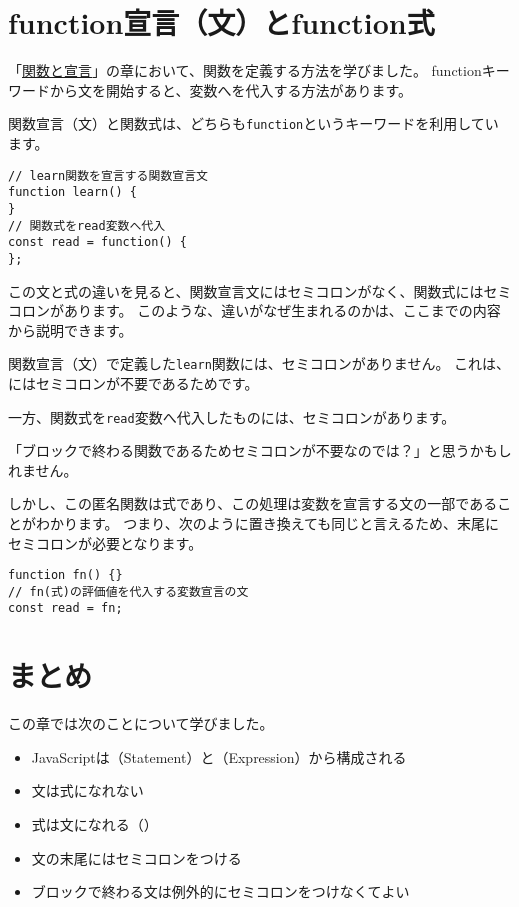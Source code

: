 \hypertarget{function-statement-and-function-expression}{%
\section{function宣言（文）とfunction式}\label{function-statement-and-function-expression}}

「\hyperlink{function-and-declaration}{関数と宣言}」の章において、関数を定義する方法を学びました。
functionキーワードから文を開始する\textbf{}と、変数へ\textbf{}を代入する方法があります。

関数宣言（文）と関数式は、どちらも\texttt{function}というキーワードを利用しています。

\begin{lstlisting}
// learn関数を宣言する関数宣言文
function learn() {
}
// 関数式をread変数へ代入
const read = function() {
};
\end{lstlisting}

この文と式の違いを見ると、関数宣言文にはセミコロンがなく、関数式にはセミコロンがあります。
このような、違いがなぜ生まれるのかは、ここまでの内容から説明できます。

関数宣言（文）で定義した\texttt{learn}関数には、セミコロンがありません。
これは、\textbf{}にはセミコロンが不要であるためです。

一方、関数式を\texttt{read}変数へ代入したものには、セミコロンがあります。

「ブロックで終わる関数であるためセミコロンが不要なのでは？」と思うかもしれません。

しかし、この匿名関数は式であり、この処理は変数を宣言する文の一部であることがわかります。
つまり、次のように置き換えても同じと言えるため、末尾にセミコロンが必要となります。

\begin{lstlisting}
function fn() {}
// fn(式)の評価値を代入する変数宣言の文
const read = fn;
\end{lstlisting}

\hypertarget{statement-expression-summary}{%
\section{まとめ}\label{statement-expression-summary}}

この章では次のことについて学びました。

\begin{itemize}
\item
  JavaScriptは（Statement）と（Expression）から構成される
\item
  文は式になれない
\item
  式は文になれる（）
\item
  文の末尾にはセミコロンをつける
\item
  ブロックで終わる文は例外的にセミコロンをつけなくてよい
\end{itemize}


